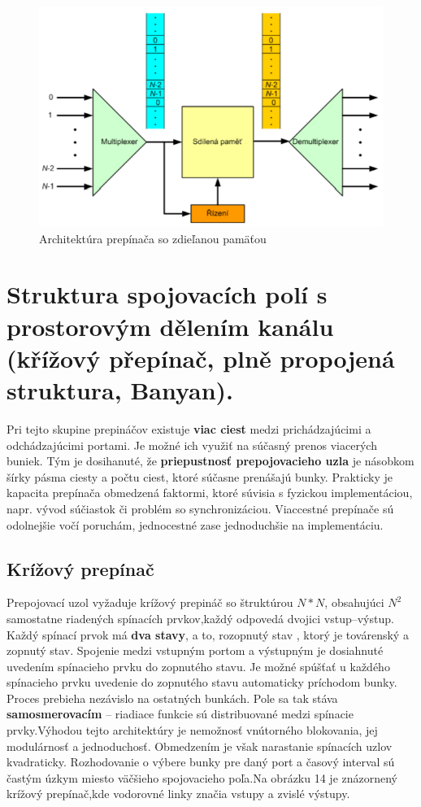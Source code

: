 \begin{figure}[ht]
\centering
  \begin{center}
    \includegraphics[scale=0.8]{images/zdiel_pamat.png}
  \end{center}
  \caption[Architektúra prepínača so zdieľanou pamäťou]{Architektúra prepínača so zdieľanou pamäťou}
\end{figure}

\newpage
\section{Struktura spojovacích polí s prostorovým dělením kanálu (křížový přepínač, plně propojená struktura, Banyan).}
Pri tejto skupine prepináčov existuje \textbf{viac ciest} medzi prichádzajúcimi a odchádzajúcimi portami. Je možné ich využiť na súčasný prenos viacerých buniek. Tým je dosihanuté, že \textbf{priepustnosť prepojovacieho uzla} je násobkom šírky pásma ciesty a počtu ciest, ktoré súčasne prenášajú bunky. Prakticky je kapacita prepínača obmedzená faktormi, ktoré súvisia s fyzickou implementáciou, napr. vývod súčiastok či problém so synchronizáciou. Viaccestné prepínače sú odolnejšie vočí poruchám, jednocestné zase jednoduchšie na implementáciu.

\subsection {Krížový prepínač}
Prepojovací uzol vyžaduje krížový prepináč so štruktúrou $N*N$, obsahujúci $N^2$ samostatne riadených spínacích prvkov,každý odpovedá dvojici vstup--výstup. Každý spínací prvok má \textbf{dva stavy}, a to, rozopnutý stav , ktorý je továrenský a zopnutý stav.
Spojenie medzi vstupným portom a výstupným je dosiahnuté uvedením spínacieho prvku do zopnutého stavu. Je možné spúšťať u každého spínacieho prvku uvedenie do zopnutého stavu automaticky príchodom bunky. Proces prebieha nezávislo na ostatných bunkách. Pole sa tak stáva \textbf{samosmerovacím} -- riadiace funkcie sú distribuované medzi spínacie prvky.Výhodou tejto architektúry je nemožnosť vnútorného blokovania, jej modulárnosť a jednoduchosť. Obmedzením je však narastanie spínacích uzlov kvadraticky. Rozhodovanie o výbere bunky pre daný port a časový interval sú častým úzkym miesto väčšieho spojovacieho poľa.Na obrázku 14 je znázornený krížový prepínač,kde vodorovné linky značia vstupy a zvislé výstupy.

